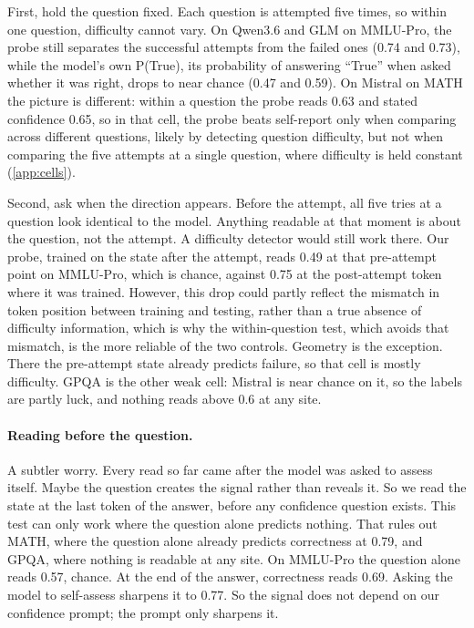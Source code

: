 \documentclass{article}
\begin{document}
First, hold the question fixed.
Each question is attempted five times, so within one question, difficulty cannot vary.
On Qwen3.6 and GLM on MMLU-Pro, the probe still separates the successful attempts from the failed ones (0.74 and 0.73), while the model's own P(True), its probability of answering ``True'' when asked whether it was right, drops to near chance (0.47 and 0.59).
On Mistral on MATH the picture is different: within a question the probe reads 0.63 and stated confidence 0.65, so in that cell, the probe beats self-report only when comparing across different questions, likely by detecting question difficulty, but not when comparing the five attempts at a single question, where difficulty is held constant (\cref{app:cells}).

Second, ask when the direction appears.
Before the attempt, all five tries at a question look identical to the model.
Anything readable at that moment is about the question, not the attempt.
A difficulty detector would still work there.
Our probe, trained on the state after the attempt, reads 0.49 at that pre-attempt point on MMLU-Pro, which is chance, against 0.75 at the post-attempt token where it was trained.
However, this drop could partly reflect the mismatch in token position between training and testing, rather than a true absence of difficulty information, which is why the within-question test, which avoids that mismatch, is the more reliable of the two controls.
Geometry is the exception.
There the pre-attempt state already predicts failure, so that cell is mostly difficulty.
GPQA is the other weak cell: Mistral is near chance on it, so the labels are partly luck, and nothing reads above 0.6 at any site.

\paragraph{Reading before the question.}
A subtler worry.
Every read so far came after the model was asked to assess itself.
Maybe the question creates the signal rather than reveals it.
So we read the state at the last token of the answer, before any confidence question exists.
This test can only work where the question alone predicts nothing.
That rules out MATH, where the question alone already predicts correctness at 0.79, and GPQA, where nothing is readable at any site.
On MMLU-Pro the question alone reads 0.57, chance.
At the end of the answer, correctness reads 0.69.
Asking the model to self-assess sharpens it to 0.77.
So the signal does not depend on our confidence prompt; the prompt only sharpens it.
\end{document}
